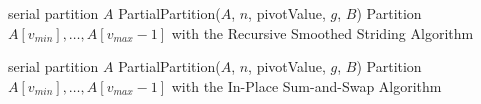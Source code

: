 \documentclass[a4paper,UKenglish,cleveref, autoref, thm-restate]{lipics-v2019}
\begin{document}
\begin{figure*}[h]
\begin{algorithmic}
        \State serial partition $A$
      \Else
        \State PartialPartition($A$, $n$, pivotValue, $g$, $B$)
        \State Partition $A[v_{min}],\ldots,A[v_{max}-1]$ with the Recursive Smoothed Striding Algorithm
      \EndIf
    \EndProcedure
    \State

        \State serial partition $A$
      \Else
        \State PartialPartition($A$, $n$, pivotValue, $g$, $B$)
        \State Partition $A[v_{min}],\ldots,A[v_{max}-1]$ with the In-Place Sum-and-Swap Algorithm
      \EndIf
    \EndProcedure

	\end{algorithmic}	
\end{figure*}
\end{document}
